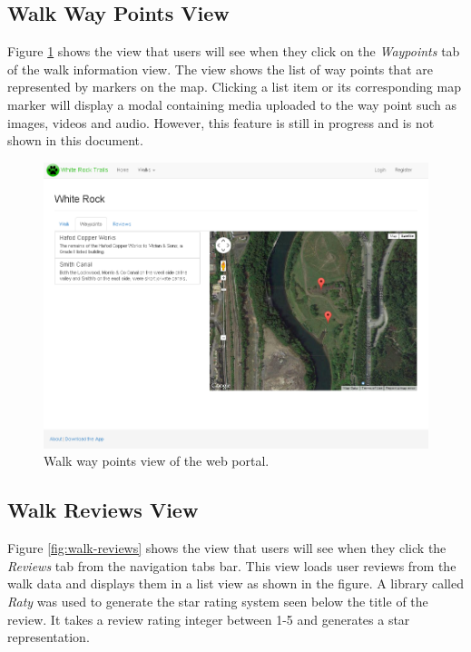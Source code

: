 \documentclass[11pt,a4paper]{article}
\begin{document}
\subsection{Walk Way Points View}

Figure \ref{fig:walk-waypoints} shows the view that users will see when they click on the \emph{Waypoints} tab of the walk information view. The view shows the list of way points that are represented by markers on the map. Clicking a list item or its corresponding map marker will display a modal containing media uploaded to the way point such as images, videos and audio. However, this feature is still in progress and is not shown in this document.

\begin{figure}[H]
\centering
\includegraphics[width=0.8\linewidth]{./img/webportal/walk-waypoints}
\caption{Walk way points view of the web portal.}
\label{fig:walk-waypoints}
\end{figure}

\subsection{Walk Reviews View}

Figure \ref{fig:walk-reviews} shows the view that users will see when they click the \emph{Reviews} tab from the navigation tabs bar. This view loads user reviews from the walk data and displays them in a list view as shown in the figure. A library called \emph{Raty} was used to generate the star rating system seen below the title of the review. It takes a review rating integer between 1-5 and generates a star representation.
\end{document}
